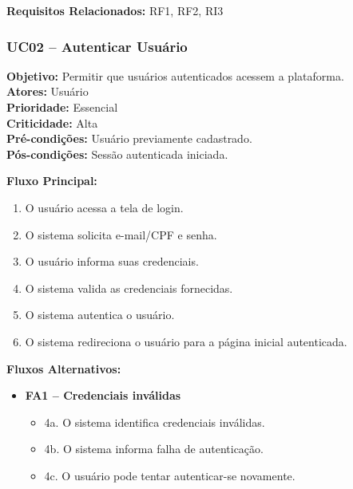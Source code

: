 ﻿\documentclass[12pt,a4paper]{article}
\begin{document}
\vspace{0.5em}
\noindent\textbf{Requisitos Relacionados:} RF1, RF2, RI3


\subsubsection{UC02 – Autenticar Usuário}
\label{uc:02}
\noindent\textbf{Objetivo:} Permitir que usuários autenticados acessem a plataforma.\\
\textbf{Atores:} Usuário\\
\textbf{Prioridade:} Essencial\\
\textbf{Criticidade:} Alta\\
\textbf{Pré-condições:} Usuário previamente cadastrado.\\
\textbf{Pós-condições:} Sessão autenticada iniciada.

\vspace{0.5em}
\noindent\textbf{Fluxo Principal:}
\begin{enumerate}[label=\arabic*.]
    \item O usuário acessa a tela de login.
    \item O sistema solicita e-mail/CPF e senha.
    \item O usuário informa suas credenciais.
    \item O sistema valida as credenciais fornecidas.
    \item O sistema autentica o usuário.
    \item O sistema redireciona o usuário para a página inicial autenticada.
\end{enumerate}

\vspace{0.5em}
\noindent\textbf{Fluxos Alternativos:}
\begin{itemize}[leftmargin=*]
    \item \textbf{FA1 – Credenciais inválidas}
    \begin{itemize}[label={}, leftmargin=0.5cm]
        \item 4a. O sistema identifica credenciais inválidas.
        \item 4b. O sistema informa falha de autenticação.
        \item 4c. O usuário pode tentar autenticar-se novamente.
    \end{itemize}
\end{itemize}
\end{document}
